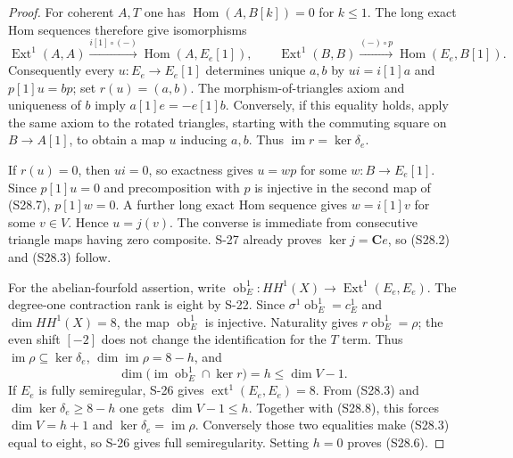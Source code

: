 \begin{proof}
For coherent $A,T$ one has
$\operatorname{Hom}(A,B[k])=0$ for $k\le1$.
The long exact Hom sequences therefore give isomorphisms
\[
 \operatorname{Ext}^1(A,A)
     \xrightarrow{i[1]\circ(-)}\operatorname{Hom}(A,E_e[1]),
 \qquad
 \operatorname{Ext}^1(B,B)
     \xrightarrow{(-)\circ p}\operatorname{Hom}(E_e,B[1]).
 \tag{S28.7}
\]
Consequently every $u:E_e\to E_e[1]$ determines unique
$a,b$ by $ui=i[1]a$ and $p[1]u=bp$; set $r(u)=(a,b)$.
The morphism-of-triangles axiom and uniqueness of $b$
imply $a[1]e=-e[1]b$. Conversely, if this equality holds,
apply the same axiom to the rotated triangles, starting
with the commuting square on $B\to A[1]$, to obtain a
map $u$ inducing $a,b$. Thus $\operatorname{im}r=\ker\delta_e$.

If $r(u)=0$, then $ui=0$, so exactness gives $u=wp$ for
some $w:B\to E_e[1]$. Since $p[1]u=0$ and precomposition
with $p$ is injective in the second map of (S28.7),
$p[1]w=0$. A further long exact Hom sequence gives
$w=i[1]v$ for some $v\in V$. Hence $u=j(v)$.
The converse is immediate from consecutive triangle maps
having zero composite. S-27 already proves
$\ker j=\mathbf C e$, so (S28.2) and (S28.3) follow.

For the abelian-fourfold assertion, write
$\operatorname{ob}^1_E:HH^1(X)\to\operatorname{Ext}^1(E_e,E_e)$.
The degree-one contraction rank is eight by S-22.
Since $\sigma^1\operatorname{ob}^1_E=c_E^1$ and
$\dim HH^1(X)=8$, the map $\operatorname{ob}^1_E$ is
injective. Naturality gives
$r\operatorname{ob}^1_E=\rho$; the even shift $[-2]$
does not change the identification for the $T$ term.
Thus $\operatorname{im}\rho\subseteq\ker\delta_e$,
$\dim\operatorname{im}\rho=8-h$, and
\[
 \dim\bigl(\operatorname{im}\operatorname{ob}^1_E
                 \cap\ker r\bigr)=h\le\dim V-1.
 \tag{S28.8}
\]
If $E_e$ is fully semiregular, S-26 gives
$\operatorname{ext}^1(E_e,E_e)=8$. From (S28.3) and
$\dim\ker\delta_e\ge8-h$ one gets $\dim V-1\le h$.
Together with (S28.8), this forces $\dim V=h+1$ and
$\ker\delta_e=\operatorname{im}\rho$.
Conversely those two equalities make (S28.3) equal to
eight, so S-26 gives full semiregularity. Setting $h=0$
proves (S28.6).
\end{proof}

